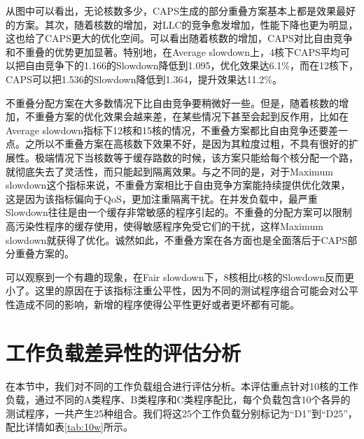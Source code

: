 从图中可以看出，无论核数多少，CAPS生成的部分重叠方案基本上都是效果最好的方案。其次，随着核数的增加，对LLC的竞争愈发增加，性能下降也更为明显，这也给了CAPS更大的优化空间。可以看出随着核数的增加，CAPS对比自由竞争和不重叠的优势更加显著。特别地，在Average slowdown上，4核下CAPS平均可以把自由竞争下的1.166的Slowdown降低到1.095，优化效果达6.1\%，而在12核下，CAPS可以把1.536的Slowdown降低到1.364，提升效果达11.2\%。

不重叠分配方案在大多数情况下比自由竞争要稍微好一些。但是，随着核数的增加，不重叠方案的优化效果会越来差，在某些情况下甚至会起到反作用，比如在Average slowdown指标下12核和15核的情况，不重叠方案都比自由竞争还要差一点。之所以不重叠方案在高核数下效果不好，是因为其粒度过粗，不具有很好的扩展性。极端情况下当核数等于缓存路数的时候，该方案只能给每个核分配一个路，就彻底失去了灵活性，而只能起到隔离效果。与之不同的是，对于Maximum slowdown这个指标来说，不重叠方案相比于自由竞争方案能持续提供优化效果，这是因为该指标偏向于QoS，更加注重隔离干扰。在并发负载中，最严重Slowdown往往是由一个缓存非常敏感的程序引起的。不重叠的分配方案可以限制高污染性程序的缓存使用，使得敏感程序免受它们的干扰，这样Maximum slowdown就获得了优化。诚然如此，不重叠方案在各方面也是全面落后于CAPS部分重叠方案的。

可以观察到一个有趣的现象，在Fair slowdown下，8核相比6核的Slowdown反而更小了。这里的原因在于该指标注重公平性，因为不同的测试程序组合可能会对公平性造成不同的影响，新增的程序使得公平性更好或者更坏都有可能。  

\section{工作负载差异性的评估分析}

在本节中，我们对不同的工作负载组合进行评估分析。本评估重点针对10核的工作负载，通过不同的A类程序、B类程序和C类程序配比，每个负载包含10个各异的测试程序，一共产生25种组合。我们将这25个工作负载分别标记为“D1”到“D25”，配比详情如表\ref{tab:10w}所示。



